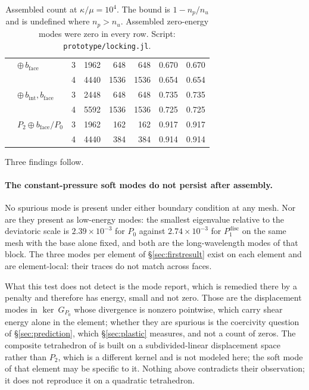 \documentclass[11pt]{article}
\newcommand{\code}[1]{\texttt{#1}}
\theoremstyle{definition}
\theoremstyle{plain}
\begin{document}
\begin{table}[h]
\begin{tabular}{@{}llrrrrrr@{}}
      & $\oplus\, b_{\mathrm{face}}$
                                  & 3 & 1962 & 648  & 648  & 0.670 & 0.670 \\
      &                           & 4 & 4440 & 1536 & 1536 & 0.654 & 0.654 \\
      & $\oplus\, b_{\mathrm{int}}, b_{\mathrm{face}}$
                                  & 3 & 2448 & 648  & 648  & 0.735 & 0.735 \\
      &                           & 4 & 5592 & 1536 & 1536 & 0.725 & 0.725 \\
      & $P_2 \oplus b_{\mathrm{face}}/P_0$
                                  & 3 & 1962 & 162  & 162  & 0.917 & 0.917 \\
      &                           & 4 & 4440 & 384  & 384  & 0.914 & 0.914 \\
\bottomrule
\end{tabular}
\caption{Assembled count at $\kappa/\mu = 10^4$. The bound is $1 - n_p/n_u$
and is undefined where $n_p > n_u$. Assembled zero-energy modes were zero in
every row. Script: \code{prototype/locking.jl}.}
\label{tab:assembled}
\end{table}

Three findings follow.

\paragraph{The constant-pressure soft modes do not persist after assembly.}
No spurious mode is present under either boundary condition at any mesh. Nor
are they present as low-energy modes: the smallest eigenvalue relative to the
deviatoric scale is $2.39\times10^{-3}$ for $P_0$ against $2.74\times10^{-3}$
for $P_1^{\mathrm{disc}}$ on the same mesh with the base alone fixed, and both
are the long-wavelength modes of that block. The three
modes per element of \S\ref{sec:firstresult} exist on each element and are element-local:
their traces do not match across faces.

What this test does not detect is the mode
\citet{Foulk.etal:2021} report, which is remedied there by a penalty and therefore has energy, small and
not zero. Those are the displacement modes in $\ker ~G_{P_0}$ whose
divergence is nonzero pointwise, which carry
shear energy alone in the element; whether they are spurious is the coercivity question of
\S\ref{sec:prediction}, which \S\ref{sec:plastic} measures, and not a count of
zeros. The composite tetrahedron of \citet{Foulk.etal:2021} is
built on a subdivided-linear displacement space rather than $P_2$, which is a
different kernel and is not modeled here; the soft mode of that element may be
specific to it. Nothing above contradicts their observation; it does not
reproduce it on a quadratic tetrahedron.
\end{document}
